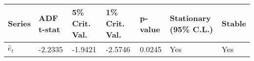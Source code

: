 \documentclass[11pt]{article}
\begin{document}
    \begin{longtable}[]{@{}lllllll@{}}
\toprule
\begin{minipage}[b]{0.07\columnwidth}\raggedright\strut
Series\strut
\end{minipage} & \begin{minipage}[b]{0.10\columnwidth}\raggedright\strut
ADF t-stat\strut
\end{minipage} & \begin{minipage}[b]{0.13\columnwidth}\raggedright\strut
5\% Crit. Val.\strut
\end{minipage} & \begin{minipage}[b]{0.13\columnwidth}\raggedright\strut
1\% Crit. Val.\strut
\end{minipage} & \begin{minipage}[b]{0.08\columnwidth}\raggedright\strut
p-value\strut
\end{minipage} & \begin{minipage}[b]{0.22\columnwidth}\raggedright\strut
Stationary (95\% C.L.)\strut
\end{minipage} & \begin{minipage}[b]{0.07\columnwidth}\raggedright\strut
Stable\strut
\end{minipage}\tabularnewline
\midrule
\endhead
\begin{minipage}[t]{0.07\columnwidth}\raggedright\strut
\(\hat{e}_t\)\strut
\end{minipage} & \begin{minipage}[t]{0.10\columnwidth}\raggedright\strut
-2.2335\strut
\end{minipage} & \begin{minipage}[t]{0.13\columnwidth}\raggedright\strut
-1.9421\strut
\end{minipage} & \begin{minipage}[t]{0.13\columnwidth}\raggedright\strut
-2.5746\strut
\end{minipage} & \begin{minipage}[t]{0.08\columnwidth}\raggedright\strut
0.0245\strut
\end{minipage} & \begin{minipage}[t]{0.22\columnwidth}\raggedright\strut
Yes\strut
\end{minipage} & \begin{minipage}[t]{0.07\columnwidth}\raggedright\strut
Yes\strut
\end{minipage}\tabularnewline
\bottomrule
\end{longtable}
    \begin{center}
    \end{center}
    { \hspace*{\fill} \\}
\end{document}
